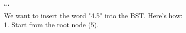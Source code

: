 \documentclass[preview]{standalone}
\begin{document}
```\\We want to insert the word "4.5" into the BST. Here's how:\\1. Start from the root node (5).\\
\end{document}
